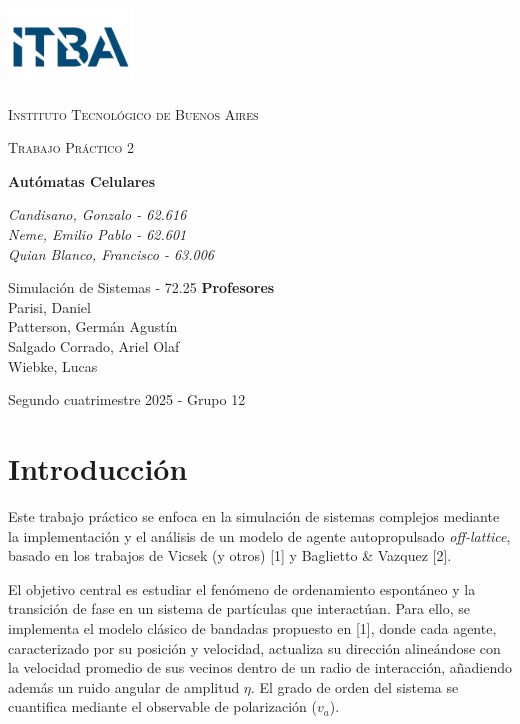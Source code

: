 \documentclass{article}
\begin{document}
\begin{titlepage}
  \centering
  \includegraphics[width=0.25\textwidth]{ITBA_logo.png}\par\vspace{1cm}
  {\textsc{Instituto Tecnológico de Buenos Aires} \par}
    \vspace{1cm}
    {\Large \textsc{Trabajo Práctico 2}\par}
    \vspace{1.5cm}
    {\huge\bfseries Autómatas Celulares\par}
    \vspace{2cm}
    {\Large\itshape Candisano, Gonzalo - 62.616\\
	  Neme, Emilio Pablo - 62.601\\
	Quian Blanco, Francisco - 63.006\par}
    \vfill
    Simulación de Sistemas - 72.25
    \vfill
    \noindent\textbf{Profesores} \\
Parisi, Daniel \\
Patterson, Germán Agustín \\
Salgado Corrado, Ariel Olaf \\
Wiebke, Lucas
\vfill
    {\large Segundo cuatrimestre 2025 - Grupo 12\par}
\end{titlepage}

\section{Introducción}
Este trabajo práctico se enfoca en la simulación de sistemas complejos mediante la implementación y el análisis de un modelo de agente autopropulsado \textit{off-lattice}, basado en los trabajos de Vicsek (y otros) [1] y Baglietto \& Vazquez [2].

\medskip

El objetivo central es estudiar el fenómeno de ordenamiento espontáneo y la transición de fase en un sistema de partículas que interactúan. Para ello, se implementa el modelo clásico de bandadas propuesto en [1], donde cada agente, caracterizado por su posición y velocidad, actualiza su dirección alineándose con la velocidad promedio de sus vecinos dentro de un radio de interacción, añadiendo además un ruido angular de amplitud $\eta$. El grado de orden del sistema se cuantifica mediante el observable de polarización ($v_a$).
\end{document}
